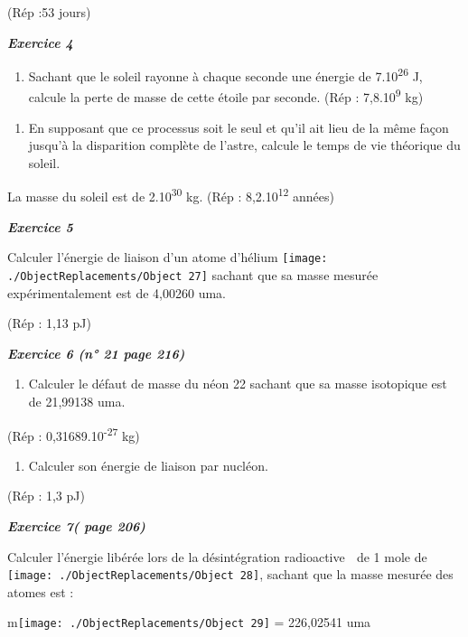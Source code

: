 (Rép :53 jours)

\emph{\textbf{Exercice 4}}

\begin{enumerate}
\def\labelenumi{\alph{enumi})}
\tightlist
\item
  Sachant que le soleil rayonne à chaque seconde une énergie de
  7.10\textsuperscript{26} J, calcule la perte de masse de cette étoile
  par seconde. (Rép : 7,8.10\textsuperscript{9} kg)
\end{enumerate}

\begin{enumerate}
\def\labelenumi{\alph{enumi})}
\tightlist
\item
  En supposant que ce processus soit le seul et qu'il ait lieu de la
  même façon jusqu'à la disparition complète de l'astre, calcule le
  temps de vie théorique du soleil.
\end{enumerate}

La masse du soleil est de 2.10\textsuperscript{30} kg. (Rép :
8,2.10\textsuperscript{12} années)

\emph{\textbf{Exercice 5}}

Calculer l'énergie de liaison d'un atome d'hélium
\texttt{[image: ./ObjectReplacements/Object 27]}
sachant que sa masse mesurée expérimentalement est de 4,00260 uma.

(Rép : 1,13 pJ)

\emph{\textbf{Exercice 6 (n° 21 page 216)}}

\begin{enumerate}
\def\labelenumi{\alph{enumi})}
\tightlist
\item
  Calculer le défaut de masse du néon 22 sachant que sa masse isotopique
  est de 21,99138 uma.
\end{enumerate}

(Rép : 0,31689.10\textsuperscript{-27} kg)

\begin{enumerate}
\def\labelenumi{\alph{enumi})}
\tightlist
\item
  Calculer son énergie de liaison par nucléon.
\end{enumerate}

(Rép : 1,3 pJ)

\emph{\textbf{Exercice 7( page 206)}}

Calculer l'énergie libérée lors de la désintégration radioactive  de 1
mole de
\texttt{[image: ./ObjectReplacements/Object 28]},
sachant que la masse mesurée des atomes est :

m\texttt{[image: ./ObjectReplacements/Object 29]}
= 226,02541 uma

